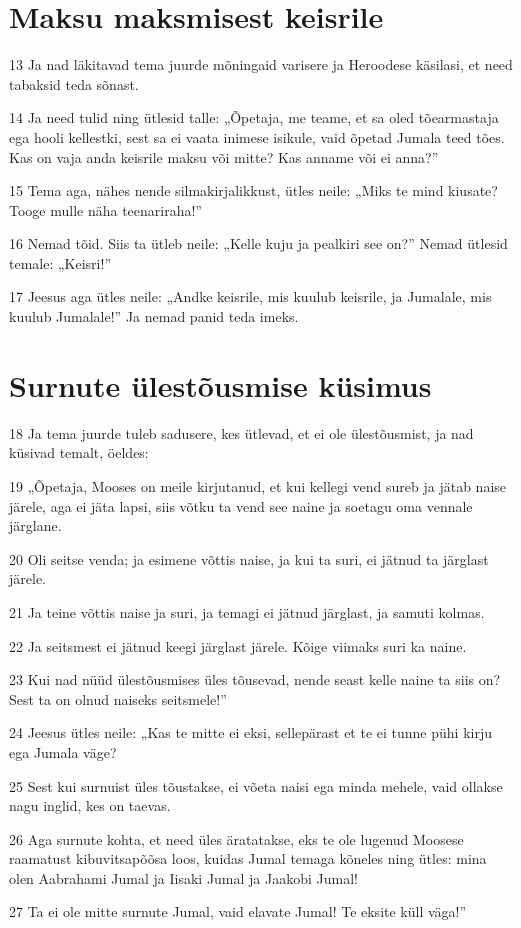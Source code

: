 \section*{Maksu maksmisest keisrile}

\par 13 Ja nad läkitavad tema juurde mõningaid varisere ja Heroodese käsilasi, et need tabaksid teda sõnast.
\par 14 Ja need tulid ning ütlesid talle: „Õpetaja, me teame, et sa oled tõearmastaja ega hooli kellestki, sest sa ei vaata inimese isikule, vaid õpetad Jumala teed tões. Kas on vaja anda keisrile maksu või mitte? Kas anname või ei anna?”
\par 15 Tema aga, nähes nende silmakirjalikkust, ütles neile: „Miks te mind kiusate? Tooge mulle näha teenariraha!”
\par 16 Nemad tõid. Siis ta ütleb neile: „Kelle kuju ja pealkiri see on?” Nemad ütlesid temale: „Keisri!”
\par 17 Jeesus aga ütles neile: „Andke keisrile, mis kuulub keisrile, ja Jumalale, mis kuulub Jumalale!” Ja nemad panid teda imeks.

\section*{Surnute ülestõusmise küsimus}

\par 18 Ja tema juurde tuleb sadusere, kes ütlevad, et ei ole ülestõusmist, ja nad küsivad temalt, öeldes:
\par 19 „Õpetaja, Mooses on meile kirjutanud, et kui kellegi vend sureb ja jätab naise järele, aga ei jäta lapsi, siis võtku ta vend see naine ja soetagu oma vennale järglane.
\par 20 Oli seitse venda; ja esimene võttis naise, ja kui ta suri, ei jätnud ta järglast järele.
\par 21 Ja teine võttis naise ja suri, ja temagi ei jätnud järglast, ja samuti kolmas.
\par 22 Ja seitsmest ei jätnud keegi järglast järele. Kõige viimaks suri ka naine.
\par 23 Kui nad nüüd ülestõusmises üles tõusevad, nende seast kelle naine ta siis on? Sest ta on olnud naiseks seitsmele!”
\par 24 Jeesus ütles neile: „Kas te mitte ei eksi, sellepärast et te ei tunne pühi kirju ega Jumala väge?
\par 25 Sest kui surnuist üles tõustakse, ei võeta naisi ega minda mehele, vaid ollakse nagu inglid, kes on taevas.
\par 26 Aga surnute kohta, et need üles äratatakse, eks te ole lugenud Moosese raamatust kibuvitsapõõsa loos, kuidas Jumal temaga kõneles ning ütles: mina olen Aabrahami Jumal ja Iisaki Jumal ja Jaakobi Jumal!
\par 27 Ta ei ole mitte surnute Jumal, vaid elavate Jumal! Te eksite küll väga!”

